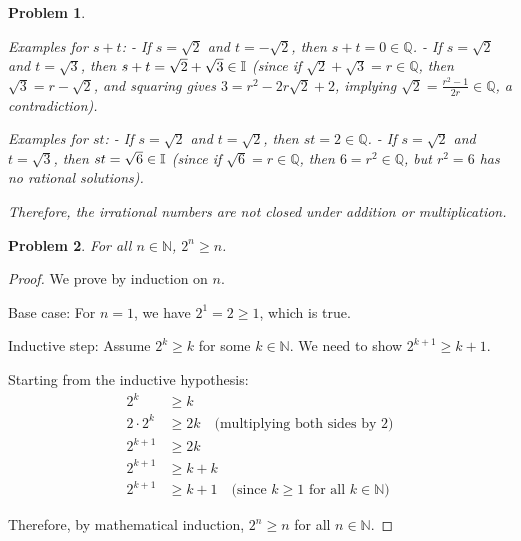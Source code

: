 \documentclass[12pt]{article}
\newtheorem{problem}{Problem}
\newcommand{\QQ}{\ensuremath{\mathbb Q}}
\newcommand{\NN}{\ensuremath{\mathbb N}}
\begin{document}
\begin{problem}
\begin{enumerate}[(a)]
Examples for $s + t$:
- If $s = \sqrt{2}$ and $t = -\sqrt{2}$, then $s + t = 0 \in \QQ$.
- If $s = \sqrt{2}$ and $t = \sqrt{3}$, then $s + t = \sqrt{2} + \sqrt{3} \in \mathbb{I}$ (since if $\sqrt{2} + \sqrt{3} = r \in \QQ$, then $\sqrt{3} = r - \sqrt{2}$, and squaring gives $3 = r^2 - 2r\sqrt{2} + 2$, implying $\sqrt{2} = \frac{r^2 - 1}{2r} \in \QQ$, a contradiction).

Examples for $st$:
- If $s = \sqrt{2}$ and $t = \sqrt{2}$, then $st = 2 \in \QQ$.
- If $s = \sqrt{2}$ and $t = \sqrt{3}$, then $st = \sqrt{6} \in \mathbb{I}$ (since if $\sqrt{6} = r \in \QQ$, then $6 = r^2 \in \QQ$, but $r^2 = 6$ has no rational solutions).

Therefore, the irrational numbers are not closed under addition or multiplication.
\end{enumerate}
\end{problem}


\begin{problem} %
For all $n\in\NN$, $2^n \ge n$.
\end{problem}

\begin{proof}
	We prove by induction on $n$.

Base case: For $n = 1$, we have $2^1 = 2 \ge 1$, which is true.

Inductive step: Assume $2^k \ge k$ for some $k \in \NN$. We need to show $2^{k+1} \ge k + 1$.

Starting from the inductive hypothesis:
\begin{align*}
2^k &\ge k \\
2 \cdot 2^k &\ge 2k \quad \text{(multiplying both sides by 2)} \\
2^{k+1} &\ge 2k \\
2^{k+1} &\ge k + k \\
2^{k+1} &\ge k + 1 \quad \text{(since $k \ge 1$ for all $k \in \NN$)}
\end{align*}

Therefore, by mathematical induction, $2^n \ge n$ for all $n \in \NN$.
\end{proof}
\end{document}
